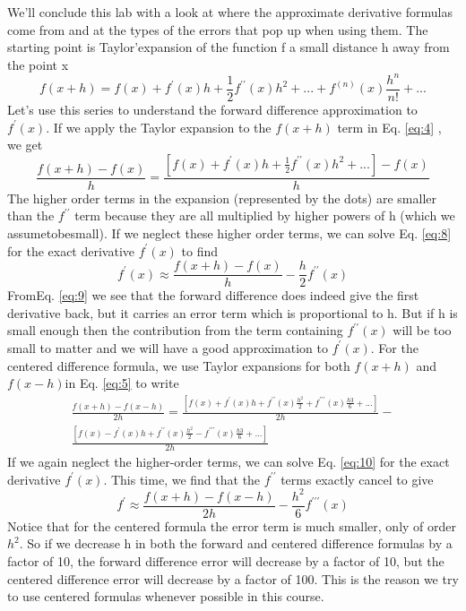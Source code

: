 We\rq ll conclude this lab with a look at where the approximate derivative formulas come from and at the types of the errors that pop up when using them. The starting point is Taylor\rq expansion of the function f a small distance h away from the point x
\begin{equation}\label{eq:7}
	f(x+h) = f(x) + f^\prime(x)h+\frac{1}{2}f^{\prime\prime}(x)h^2 + ... + f^{(n)}(x)\frac{h^n}{n!} + ...
\end{equation}
Let\rq s use this series to understand the forward difference approximation to $f^\prime(x)$. If we apply the Taylor expansion to the $f(x+h)$ term in Eq. \ref{eq:4} , we get
\begin{equation}\label{eq:8}
\frac{f(x+h) - f(x)}{h}= \frac{[f(x)+f^\prime(x)h+\frac{1}{2}f^{\prime\prime}(x)h^2+...]-f(x)}{h}
\end{equation}
The higher order terms in the expansion (represented by the dots) are smaller than the $f^{\prime\prime}$ term because they are all multiplied by higher powers of h (which we assumetobesmall). If we neglect these higher order terms, we can solve Eq. \ref{eq:8} for the exact derivative $f^{\prime}(x)$ to find
\begin{equation}\label{eq:9}
f^\prime(x) \approx \frac{f(x+h)-f(x)}{h}-\frac{h}{2}f^{\prime\prime}(x)
\end{equation}
FromEq. \ref{eq:9} we see that the forward difference does indeed give the first derivative back, but it carries an error term which is proportional to h. But if h is small enough then the contribution from the term containing $f^{\prime\prime}(x)$ will be too small to matter and we will have a good approximation to $f^\prime(x)$. For the centered difference formula, we use Taylor expansions for both $f(x+h)$ and $f(x−h)$in Eq. \ref{eq:5} to write
\begin{align} \label{eq:10}
	\frac{f(x+h)-f(x-h)}{2h} = \frac{[f(x)+f^\prime(x)h+f^{\prime\prime}(x)\frac{h^2}{2}+f^{\prime\prime\prime}(x)\frac{h3}{6}+...]}{2h}- \\ 
  \frac{[f(x)-f^\prime(x)h+f^{\prime\prime}(x)\frac{h^2}{2}-f^{\prime\prime\prime}(x)\frac{h3}{6}+...]}{2h}
\end{align}
If we again neglect the higher-order terms, we can solve Eq. \ref{eq:10} for the exact derivative $f^\prime(x)$. This time, we find that the $f^{\prime\prime}$ terms exactly cancel to give
\begin{equation} \label{eq:11}
	f^\prime \approx \frac{f(x+h) - f(x-h)}{2h} - \frac{h^2}{6} f^{\prime\prime\prime}(x) 
\end{equation}
Notice that for the centered formula the error term is much smaller, only of order $h^2$. So if we decrease h in both the forward and centered difference formulas by a factor of 10, the forward difference error will decrease by a factor of 10, but the centered difference error will decrease by a factor of 100. This is the reason we try to use centered formulas whenever possible in this course.


